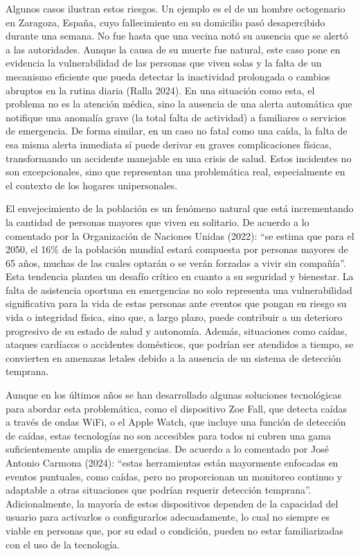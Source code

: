 Algunos casos ilustran estos riesgos. Un ejemplo es el de un hombre octogenario en Zaragoza, España, cuyo fallecimiento en su domicilio pasó desapercibido durante una semana. No fue hasta que una vecina notó su ausencia que se alertó a las autoridades. Aunque la causa de su muerte fue natural, este caso pone en evidencia la vulnerabilidad de las personas que viven solas y la falta de un mecanismo eficiente que pueda detectar la inactividad prolongada o cambios abruptos en la rutina diaria (Ralla 2024). En una situación como esta, el problema no es la atención médica, sino la ausencia de una alerta automática que notifique una anomalía grave (la total falta de actividad) a familiares o servicios de emergencia. De forma similar, en un caso no fatal como una caída, la falta de esa misma alerta inmediata sí puede derivar en graves complicaciones físicas, transformando un accidente manejable en una crisis de salud. Estos incidentes no son excepcionales, sino que representan una problemática real, especialmente en el contexto de los hogares unipersonales.

El envejecimiento de la población es un fenómeno natural que está incrementando la cantidad de personas mayores que viven en solitario. De acuerdo a lo comentado por la Organización de Naciones Unidas (2022): ``se estima que para el 2050, el 16\% de la población mundial estará compuesta por personas mayores de 65 años, muchas de las cuales optarán o se verán forzadas a vivir sin compañía''. Esta tendencia plantea un desafío crítico en cuanto a su seguridad y bienestar. La falta de asistencia oportuna en emergencias no solo representa una vulnerabilidad significativa para la vida de estas personas ante eventos que pongan en riesgo su vida o integridad física, sino que, a largo plazo, puede contribuir a un deterioro progresivo de su estado de salud y autonomía. Además, situaciones como caídas, ataques cardíacos o accidentes domésticos, que podrían ser atendidos a tiempo, se convierten en amenazas letales debido a la ausencia de un sistema de detección temprana.

Aunque en los últimos años se han desarrollado algunas soluciones tecnológicas para abordar esta problemática, como el dispositivo Zoe Fall, que detecta caídas a través de ondas WiFi, o el Apple Watch, que incluye una función de detección de caídas, estas tecnologías no son accesibles para todos ni cubren una gama suficientemente amplia de emergencias. De acuerdo a lo comentado por José Antonio Carmona (2024): ``estas herramientas están mayormente enfocadas en eventos puntuales, como caídas, pero no proporcionan un monitoreo continuo y adaptable a otras situaciones que podrían requerir detección temprana''. Adicionalmente, la mayoría de estos dispositivos dependen de la capacidad del usuario para activarlos o configurarlos adecuadamente, lo cual no siempre es viable en personas que, por su edad o condición, pueden no estar familiarizadas con el uso de la tecnología.


